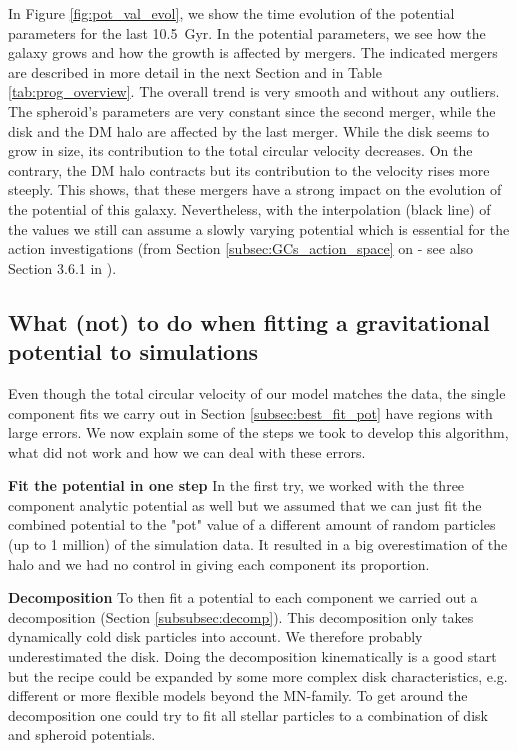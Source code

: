 In Figure \ref{fig:pot_val_evol}, we show the time evolution of the potential parameters for the last \SI{10.5}{Gyr}. In the potential parameters, we see how the galaxy grows and how the growth is affected by mergers. The indicated mergers are described in more detail in the next Section and in Table \ref{tab:prog_overview}. The overall trend is very smooth and without any outliers. The spheroid's parameters are very constant since the second merger, while the disk and the \ac{DM} halo are affected by the last merger. While the disk seems to grow in size, its contribution to the total circular velocity decreases. On the contrary, the \ac{DM} halo contracts but its contribution to the velocity rises more steeply. This shows, that these mergers have a strong impact on the evolution of the potential of this galaxy. Nevertheless, with the interpolation (black line) of the values we still can assume a slowly varying potential which is essential for the action investigations (from Section \ref{subsec:GCs_action_space} on - see also Section 3.6.1 in \citealp{Binney...Tremaine...2008}). 

\subsection{What (not) to do when fitting a gravitational potential to simulations}\label{subsec:wrong_pot_fit}
Even though the total circular velocity of our model matches the data, the single component fits we carry out in Section \ref{subsec:best_fit_pot} have regions with large errors. We now explain some of the steps we took to develop this algorithm, what did not work and how we can deal with these errors.

\textbf{Fit the potential in one step}
In the first try, we worked with the three component analytic potential as well but we assumed that we can just fit the combined potential to the "pot" value of a different amount of random particles (up to 1 million) of the simulation data. It resulted in a big overestimation of the halo and we had no control in giving each component its proportion.

\textbf{Decomposition}
To then fit a potential to each component we carried out a decomposition (Section \ref{subsubsec:decomp}). This decomposition only takes dynamically cold disk particles into account. We therefore probably underestimated the disk. Doing the decomposition kinematically is a good start but the recipe could be expanded by some more complex disk characteristics, e.g. different or more flexible models beyond the \ac{MN}-family. To get around the decomposition one could try to fit all stellar particles to a combination of disk and spheroid potentials.

